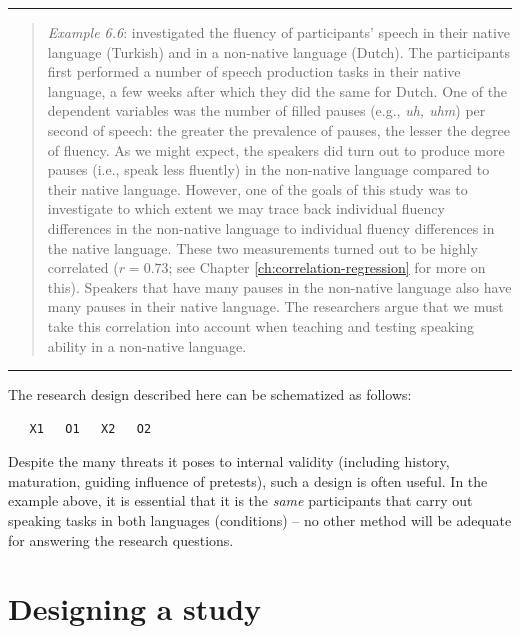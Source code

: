 \documentclass[
]{book}
\begin{document}
\begin{center}\rule{0.5\linewidth}{0.5pt}\end{center}

\begin{quote}
\emph{Example 6.6}: \citet{JGSH13} investigated the fluency of participants' speech in their native language (Turkish) and in a non-native language (Dutch). The participants first performed a number of speech production tasks in their native language, a few weeks after which they did the same for Dutch. One of the dependent variables was the number of filled pauses (e.g., \emph{uh, uhm}) per second of speech: the greater the prevalence of pauses, the lesser the degree of fluency. As we might expect, the speakers did turn out to produce more pauses (i.e., speak less fluently) in the non-native language compared to their native language. However, one of the goals of this study was to investigate to which extent we may trace back individual fluency differences in the non-native language to individual fluency differences in the native language. These two measurements turned out to be highly correlated (\(r = 0.73\); see Chapter \ref{ch:correlation-regression} for more on this). Speakers that have many pauses in the non-native language also have many pauses in their native language. The researchers argue that we must take this correlation into account when teaching and testing speaking ability in a non-native language.
\end{quote}

\begin{center}\rule{0.5\linewidth}{0.5pt}\end{center}

The research design described here can be schematized as follows:

\begin{verbatim}
   X1   O1   X2   O2
\end{verbatim}

Despite the many threats it poses to internal validity (including history, maturation, guiding influence of pretests), such a design is often useful. In the example above, it is essential that it is the \emph{same} participants that carry out speaking tasks in both languages (conditions) -- no other method will be adequate for answering the research questions.

\hypertarget{designing-a-study}{%
\section{Designing a study}\label{designing-a-study}}
\end{document}
